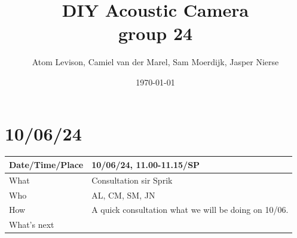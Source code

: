 \documentclass{article}
\title{%
  DIY Acoustic Camera \\
  \Minutes group 24 }
\author{Atom Levison, Camiel van der Marel, Sam Moerdijk, Jasper Nierse}
\date{\today}
\begin{document}
\maketitle

\newpage

\chapter{10/06/24}

\begin{table}[H]
\begin{tabular}{|p{1.5in}|p{4in}|}
\hline
Date/Time/Place &  10/06/24, 11.00-11.15/SP\\ \hline
What            &  Consultation sir Sprik\\ \hline
Who             &  AL, CM, SM, JN\\ \hline
How             &  A quick consultation what we will be doing on 10/06.  \\ \hline
What's next     &  \\ \hline
\end{tabular}
\end{table}
\end{document}
